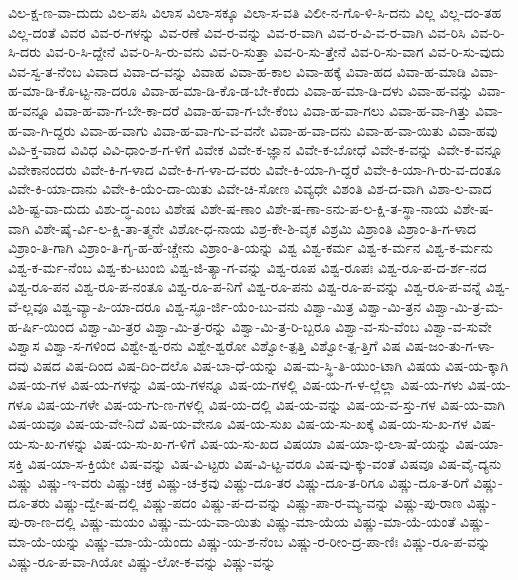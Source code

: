{ವಿಲ-ಕ್ಷ-ಣ-ವಾ-ದುದು
ವಿಲ-ಪಸಿ
ವಿಲಾಸ
ವಿಲಾ-ಸಕ್ಕೂ
ವಿಲಾ-ಸ-ವತಿ
ವಿಲೀ-ನ-ಗೊ-ಳಿ-ಸಿ-ದನು
ವಿಲ್ಲ
ವಿಲ್ಲ-ದಂ-ತಹ
ವಿಲ್ಲ-ದಂತೆ
ವಿವರ
ವಿವ-ರ-ಗಳನ್ನು
ವಿವ-ರಣೆ
ವಿವ-ರ-ವನ್ನು
ವಿವ-ರ-ವಾಗಿ
ವಿವ-ರ-ವಿ-ವ-ರ-ವಾಗಿ
ವಿವ-ರಿಸಿ
ವಿವ-ರಿ-ಸಿ-ದರು
ವಿವ-ರಿ-ಸಿ-ದ್ದೇನೆ
ವಿವ-ರಿ-ಸಿ-ರು-ವನು
ವಿವ-ರಿ-ಸುತ್ತಾ
ವಿವ-ರಿ-ಸು-ತ್ತೇನೆ
ವಿವ-ರಿ-ಸು-ವಾಗ
ವಿವ-ರಿ-ಸು-ವುದು
ವಿವ-ಸ್ವ-ತ-ನೆಂಬ
ವಿವಾದ
ವಿವಾ-ದ-ವನ್ನು
ವಿವಾಹ
ವಿವಾ-ಹ-ಕಾಲ
ವಿವಾ-ಹಕ್ಕೆ
ವಿವಾ-ಹದ
ವಿವಾ-ಹ-ಮಾಡಿ
ವಿವಾ-ಹ-ಮಾ-ಡಿ-ಕೊ-ಟ್ಟ-ನಾ-ದರೂ
ವಿವಾ-ಹ-ಮಾ-ಡಿ-ಕೊ-ಡ-ಬೇ-ಕೆಂದು
ವಿವಾ-ಹ-ಮಾ-ಡಿ-ದಳು
ವಿವಾ-ಹ-ವನ್ನು
ವಿವಾ-ಹ-ವನ್ನೂ
ವಿವಾ-ಹ-ವಾ-ಗ-ಬೇ-ಕಾ-ದರೆ
ವಿವಾ-ಹ-ವಾ-ಗ-ಬೇ-ಕೆಂಬ
ವಿವಾ-ಹ-ವಾ-ಗಲು
ವಿವಾ-ಹ-ವಾ-ಗಿತ್ತು
ವಿವಾ-ಹ-ವಾ-ಗಿ-ದ್ದರು
ವಿವಾ-ಹ-ವಾಗು
ವಿವಾ-ಹ-ವಾ-ಗು-ವ-ವನೇ
ವಿವಾ-ಹ-ವಾ-ದನು
ವಿವಾ-ಹ-ವಾ-ಯಿತು
ವಿವಾ-ಹವು
ವಿವಿ-ಕ್ತ-ವಾದ
ವಿವಿಧ
ವಿವಿ-ಧಾಂ-ಶ-ಗ-ಳಿಗೆ
ವಿವೇಕ
ವಿವೇ-ಕ-ಜ್ಞಾನ
ವಿವೇ-ಕ-ಬೋಧೆ
ವಿವೇ-ಕ-ವನ್ನು
ವಿವೇ-ಕ-ವನ್ನೂ
ವಿವೇಕಾನಂದರು
ವಿವೇ-ಕಿ-ಗ-ಳಾದ
ವಿವೇ-ಕಿ-ಗ-ಳಾ-ದ-ವರು
ವಿವೇ-ಕಿ-ಯಾ-ಗಿ-ದ್ದರೆ
ವಿವೇ-ಕಿ-ಯಾ-ಗಿ-ರು-ವ-ದಂತೂ
ವಿವೇ-ಕಿ-ಯಾ-ದಾನು
ವಿವೇ-ಕಿ-ಯೆಂ-ದಾ-ಯಿತು
ವಿವೇ-ಚಿ-ಸೋಣ
ವಿವ್ಯಧೇ
ವಿಶಂತಿ
ವಿಶ-ದ-ವಾಗಿ
ವಿಶಾ-ಲ-ವಾದ
ವಿಶಿ-ಷ್ಟ-ವಾ-ದುದು
ವಿಶು-ದ್ಧ-ಎಂಬ
ವಿಶೇಷ
ವಿಶೇ-ಷ-ಣಾಂ
ವಿಶೇ-ಷ-ಣಾ-ಽನು-ಪ-ಲ-ಕ್ಷಿ-ತ-ಸ್ಥಾ-ನಾಯ
ವಿಶೇ-ಷ-ವಾಗಿ
ವಿಶೇ-ಷೈ-ರ್ವಿ-ಲ-ಕ್ಷಿ-ತಾ-ತ್ಮನೇ
ವಿಶೋ-ಧ-ನಾಯ
ವಿಶ್ರ-ಕೇ-ಶಿ-ವೃಕ
ವಿಶ್ರಮಿ
ವಿಶ್ರಾಂತಿ
ವಿಶ್ರಾಂ-ತಿ-ಗ-ಳಾದ
ವಿಶ್ರಾಂ-ತಿ-ಗಾಗಿ
ವಿಶ್ರಾಂ-ತಿ-ಗೃ-ಹ-ಹೆ-ಚ್ಚೇನು
ವಿಶ್ರಾಂ-ತಿ-ಯನ್ನು
ವಿಶ್ವ
ವಿಶ್ವ-ಕರ್ಮ
ವಿಶ್ವ-ಕ-ರ್ಮನ
ವಿಶ್ವ-ಕ-ರ್ಮನು
ವಿಶ್ವ-ಕ-ರ್ಮ-ನೆಂಬ
ವಿಶ್ವ-ಕು-ಟುಂಬಿ
ವಿಶ್ವ-ಜಿ-ತ್ಯಾ-ಗ-ವನ್ನು
ವಿಶ್ವ-ರೂಪ
ವಿಶ್ವ-ರೂಪಃ
ವಿಶ್ವ-ರೂ-ಪ-ದ-ರ್ಶ-ನದ
ವಿಶ್ವ-ರೂ-ಪನ
ವಿಶ್ವ-ರೂ-ಪ-ನಂತೂ
ವಿಶ್ವ-ರೂ-ಪ-ನಿಗೆ
ವಿಶ್ವ-ರೂ-ಪನು
ವಿಶ್ವ-ರೂ-ಪ-ವನ್ನು
ವಿಶ್ವ-ರೂ-ಪ-ವನ್ನೆ
ವಿಶ್ವ-ವೆ-ಲ್ಲವೂ
ವಿಶ್ವ-ವ್ಯಾ-ಪಿ-ಯಾ-ದರೂ
ವಿಶ್ವ-ಸ್ಫೂ-ರ್ಜಿ-ಯೆಂ-ಬು-ವನು
ವಿಶ್ವಾ-ಮಿತ್ರ
ವಿಶ್ವಾ-ಮಿ-ತ್ರನ
ವಿಶ್ವಾ-ಮಿ-ತ್ರ-ಮ-ಹ-ರ್ಷಿ-ಯಿಂದ
ವಿಶ್ವಾ-ಮಿ-ತ್ರರ
ವಿಶ್ವಾ-ಮಿ-ತ್ರ-ರನ್ನು
ವಿಶ್ವಾ-ಮಿ-ತ್ರ-ರಿ-ಬ್ಬರೂ
ವಿಶ್ವಾ-ವ-ಸು-ವೆಂಬ
ವಿಶ್ವಾ-ವ-ಸುವೇ
ವಿಶ್ವಾಸ
ವಿಶ್ವಾ-ಸ-ಗಳಿಂದ
ವಿಶ್ವೇ-ಶ್ವ-ರನು
ವಿಶ್ವೇ-ಶ್ವರೋ
ವಿಶ್ವೋ-ತ್ಪತ್ತಿ
ವಿಶ್ವೋ-ತ್ಪ-ತ್ತಿಗೆ
ವಿಷ
ವಿಷ-ಜಂ-ತು-ಗ-ಳಾ-ದವು
ವಿಷದ
ವಿಷ-ದಿಂದ
ವಿಷ-ದಿಂ-ದಲೊ
ವಿಷ-ಬಾ-ಧೆ-ಯನ್ನು
ವಿಷ-ಮ-ಸ್ಥಿ-ತಿ-ಯುಂ-ಟಾಗಿ
ವಿಷಯ
ವಿಷ-ಯ-ಕ್ಕಾಗಿ
ವಿಷ-ಯ-ಗಳ
ವಿಷ-ಯ-ಗಳನ್ನು
ವಿಷ-ಯ-ಗಳನ್ನೂ
ವಿಷ-ಯ-ಗಳಲ್ಲಿ
ವಿಷ-ಯ-ಗ-ಳ-ಲ್ಲೆಲ್ಲಾ
ವಿಷ-ಯ-ಗಳು
ವಿಷ-ಯ-ಗಳೂ
ವಿಷ-ಯ-ಗಳೇ
ವಿಷ-ಯ-ಗು-ಣ-ಗಳಲ್ಲಿ
ವಿಷ-ಯ-ದಲ್ಲಿ
ವಿಷ-ಯ-ವನ್ನು
ವಿಷ-ಯ-ವ-ಸ್ತು-ಗಳ
ವಿಷ-ಯ-ವಾಗಿ
ವಿಷ-ಯವೂ
ವಿಷ-ಯ-ವೇ-ನಿದೆ
ವಿಷ-ಯ-ವೇನೂ
ವಿಷ-ಯ-ಸುಖ
ವಿಷ-ಯ-ಸು-ಖಕ್ಕೆ
ವಿಷ-ಯ-ಸು-ಖ-ಗಳ
ವಿಷ-ಯ-ಸು-ಖ-ಗಳನ್ನು
ವಿಷ-ಯ-ಸು-ಖ-ಗ-ಳಿಗೆ
ವಿಷ-ಯ-ಸು-ಖದ
ವಿಷಯಾ
ವಿಷ-ಯಾ-ಭಿ-ಲಾ-ಷೆ-ಯನ್ನು
ವಿಷ-ಯಾ-ಸಕ್ತಿ
ವಿಷ-ಯಾ-ಸ-ಕ್ತಿಯೇ
ವಿಷ-ವನ್ನು
ವಿಷ-ವಿ-ಟ್ಟರು
ವಿಷ-ವಿ-ಟ್ಟ-ವರೂ
ವಿಷ-ವು-ಕ್ಕು-ವಂತೆ
ವಿಷವೂ
ವಿಷ-ವೈ-ದ್ಯನು
ವಿಷ್ಣು
ವಿಷ್ಣು-ಇ-ವರು
ವಿಷ್ಣು-ಚಕ್ರ
ವಿಷ್ಣು-ಚ-ಕ್ರವು
ವಿಷ್ಣು-ದೂ-ತರ
ವಿಷ್ಣು-ದೂ-ತ-ರಿಗೂ
ವಿಷ್ಣು-ದೂ-ತ-ರಿಗೆ
ವಿಷ್ಣು-ದೂ-ತರು
ವಿಷ್ಣು-ದ್ವೇ-ಷ-ದಲ್ಲಿ
ವಿಷ್ಣು-ಪದಂ
ವಿಷ್ಣು-ಪ-ದ-ವನ್ನು
ವಿಷ್ಣು-ಪಾ-ರ-ಮ್ಯ-ವನ್ನು
ವಿಷ್ಣು-ಪು-ರಾಣ
ವಿಷ್ಣು-ಪು-ರಾ-ಣ-ದಲ್ಲಿ
ವಿಷ್ಣು-ಮಯಂ
ವಿಷ್ಣು-ಮ-ಯ-ವಾ-ಯಿತು
ವಿಷ್ಣು-ಮಾ-ಯೆಯ
ವಿಷ್ಣು-ಮಾ-ಯೆ-ಯಂತೆ
ವಿಷ್ಣು-ಮಾ-ಯೆ-ಯನ್ನು
ವಿಷ್ಣು-ಮಾ-ಯೆ-ಯೆಂದು
ವಿಷ್ಣು-ಯ-ಶ-ನೆಂಬ
ವಿಷ್ಣು-ರ-ರೀಂ-ದ್ರ-ಪಾ-ಣಿಃ
ವಿಷ್ಣು-ರೂ-ಪ-ವನ್ನು
ವಿಷ್ಣು-ರೂ-ಪ-ವಾ-ಗಿಯೋ
ವಿಷ್ಣು-ಲೋ-ಕ-ವನ್ನು
ವಿಷ್ಣು-ವನ್ನು
}
